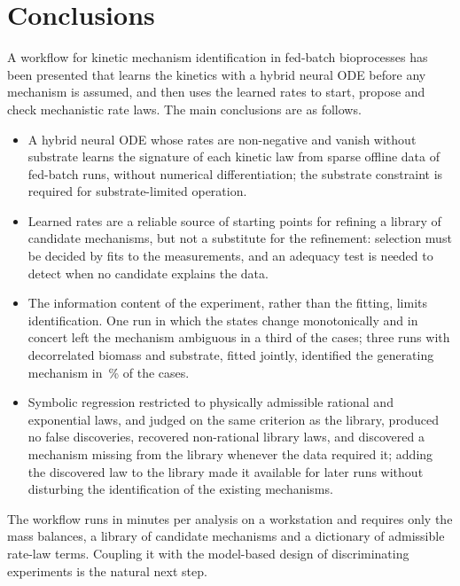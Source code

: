 \section{Conclusions}\label{sec:conclusions}
A workflow for kinetic mechanism identification in fed-batch bioprocesses has been presented that learns the kinetics with a hybrid neural ODE before any mechanism is assumed, and then uses the learned rates to start, propose and check mechanistic rate laws. The main conclusions are as follows.
\begin{itemize}
\item A hybrid neural ODE whose rates are non-negative and vanish without substrate learns the signature of each kinetic law from sparse offline data of fed-batch runs, without numerical differentiation; the substrate constraint is required for substrate-limited operation.
\item Learned rates are a reliable source of starting points for refining a library of candidate mechanisms, but not a substitute for the refinement: selection must be decided by fits to the measurements, and an adequacy test is needed to detect when no candidate explains the data.
\item The information content of the experiment, rather than the fitting, limits identification. One run in which the states change monotonically and in concert left the mechanism ambiguous in a third of the cases; three runs with decorrelated biomass and substrate, fitted jointly, identified the generating mechanism in \ConeAccJoint\,\% of the cases.
\item Symbolic regression restricted to physically admissible rational and exponential laws, and judged on the same criterion as the library, produced no false discoveries, recovered non-rational library laws, and discovered a mechanism missing from the library whenever the data required it; adding the discovered law to the library made it available for later runs without disturbing the identification of the existing mechanisms.

\end{itemize}
The workflow runs in minutes per analysis on a workstation and requires only the mass balances, a library of candidate mechanisms and a dictionary of admissible rate-law terms. Coupling it with the model-based design of discriminating experiments is the natural next step.
